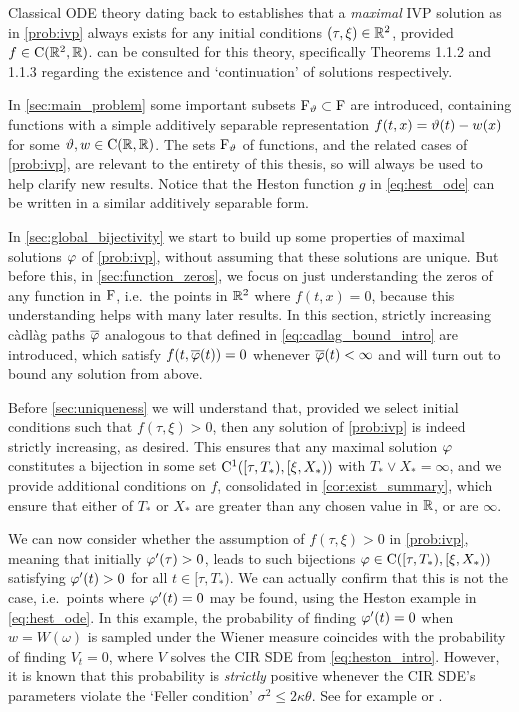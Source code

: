 Classical ODE theory dating back to \cite{peano_1890} establishes that a \emph{maximal} IVP solution as in \autoref{prob:ivp} always exists for any initial conditions $(\tau,\xi)\in\mathbb{R}^2$, provided $f\in\mathrm{C}(\mathbb{R}^2,\mathbb{R})$. \cite{lakshmikantham_1969} can be consulted for this theory, specifically Theorems 1.1.2 and 1.1.3 regarding the existence and `continuation' of solutions respectively.

In \autoref{sec:main_problem} some important subsets $\mathrm{F}_\vartheta\subset \mathrm{F}$ are introduced, containing functions with a simple additively separable representation $f(t,x)=\vartheta(t) - w(x)$ for some $\vartheta,w\in\mathrm{C}(\mathbb{R},\mathbb{R})$. The sets $\mathrm{F}_\vartheta$ of functions, and the related cases of \autoref{prob:ivp}, are relevant to the entirety of this thesis, so will always be used to help clarify new results. Notice that the Heston function $g$ in \autoref{eq:hest_ode} can be written in a similar additively separable form.

In \autoref{sec:global_bijectivity} we start to build up some properties of maximal solutions $\varphi$ of \autoref{prob:ivp}, without assuming that these solutions are unique. But before this, in \autoref{sec:function_zeros}, we focus on just understanding the zeros of any function in $\mathrm{F}$, i.e.~the points in $\mathbb{R}^2$ where $f(t,x)=0$, because this understanding helps with many later results. In this section, strictly increasing c\`adl\`ag paths $\overline{\varphi}$ analogous to that defined in \autoref{eq:cadlag_bound_intro} are introduced, which satisfy $f(t,\overline{\varphi}(t))=0$ whenever $\overline{\varphi}(t)<\infty$ and will turn out to bound any solution from above.

Before \autoref{sec:uniqueness} we will understand that, provided we select initial conditions such that $f(\tau,\xi)>0$, then any solution of \autoref{prob:ivp} is indeed strictly increasing, as desired. This ensures that any maximal solution $\varphi$ constitutes a bijection in some set $\mathrm{C}^1([\tau,T_*),[\xi,X_*))$ with $T_*\vee X_*=\infty$, and we provide additional conditions on $f$, consolidated in \autoref{cor:exist_summary}, which ensure that either of $T_*$ or $X_*$ are greater than any chosen value in $\mathbb{R}$, or are $\infty$.

We can now consider whether the assumption of $f(\tau,\xi)>0$ in \autoref{prob:ivp}, meaning that initially $\varphi'(\tau)>0$, leads to such bijections $\varphi\in\mathrm{C}([\tau,T_*),[\xi,X_*))$ satisfying $\varphi'(t)>0$ for all $t\in[\tau,T_*)$. We can actually confirm that this is not the case, i.e.~points where $\varphi'(t)=0$ may be found, using the Heston example in \autoref{eq:hest_ode}. In this example, the probability of finding $\varphi'(t)=0$ when $w=W(\omega)$ is sampled under the Wiener measure coincides with the probability of finding $V_t=0$, where $V$ solves the CIR SDE from \autoref{eq:heston_intro}. However, it is known that this probability is \emph{strictly} positive whenever the CIR SDE's parameters violate the `Feller condition' $\sigma^2\le2\kappa\theta$. See for example \cite{feller_1968} or \cite{cox_1985}.

